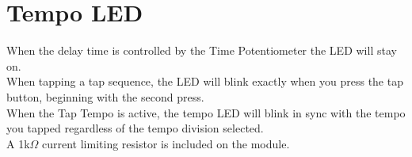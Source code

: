\documentclass[a4paper, 10pt]{article}
\begin{document}
\section{Tempo LED}
\label{sec:led}
\bigbreak
When the delay time is controlled by the Time Potentiometer the LED will stay on.\\
When tapping a tap sequence, the LED will blink exactly when you press the tap button, beginning with the second press.\\
When the Tap Tempo is active, the tempo LED will blink in sync with the tempo you tapped regardless of the tempo division selected.\\
A 1k$\Omega$ current limiting resistor is included on the module.
\end{document}
